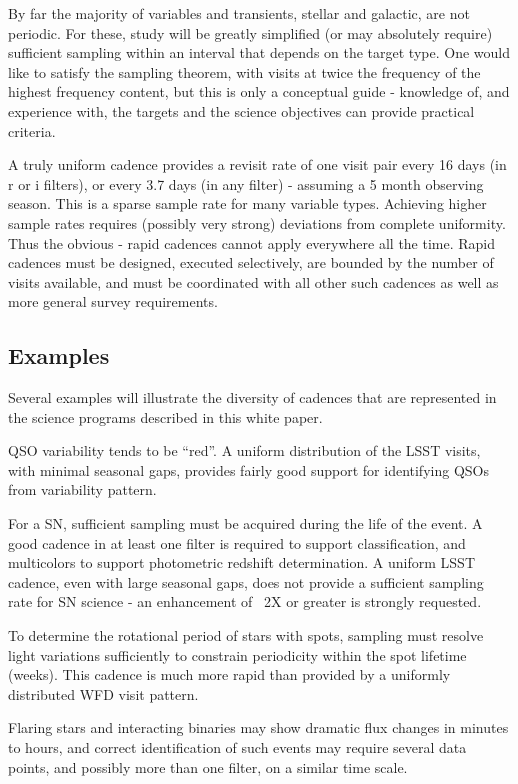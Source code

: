 By far the majority of variables and transients, stellar and galactic,
are not periodic. For these, study will be greatly simplified (or may
absolutely require) sufficient sampling within an interval that depends
on the target type. One would like to satisfy the sampling theorem, with
visits at twice the frequency of the highest frequency content, but this
is only a conceptual guide - knowledge of, and experience with, the
targets and the science objectives can provide practical criteria.

A truly uniform cadence provides a revisit rate of one visit pair every
16 days (in r or i filters), or every 3.7 days (in any filter) -
assuming a 5 month observing season.  This is a sparse sample rate for
many variable types.  Achieving higher sample rates requires (possibly
very strong) deviations from complete uniformity.  Thus the obvious -
rapid cadences cannot apply everywhere all the time. Rapid cadences must
be designed, executed selectively, are bounded by the number of visits
available, and must be coordinated with all other such cadences as well
as more general survey requirements.

\subsection{Examples}

Several examples will illustrate the diversity of cadences that are
represented in the science programs described in this white paper.

QSO variability tends to be ``red''.   A uniform distribution of the
LSST visits, with minimal seasonal gaps, provides fairly good support
for identifying QSOs from variability pattern.

For a SN, sufficient sampling must be acquired during the life of the
event. A good cadence in at least one filter is required to support
classification, and multicolors to support photometric redshift
determination.  A uniform LSST  cadence, even with large seasonal gaps,
does not provide a sufficient sampling rate for SN science - an
enhancement of ~2X or greater is strongly requested.

To determine the rotational period of stars with spots, sampling must
resolve light variations sufficiently to constrain periodicity within
the spot lifetime (weeks). This cadence is much more rapid than provided
by a uniformly distributed WFD visit pattern.

Flaring stars and interacting binaries  may show dramatic flux changes
in minutes to hours, and correct identification of such events may
require several data points, and possibly more than one filter, on a
similar time scale.

